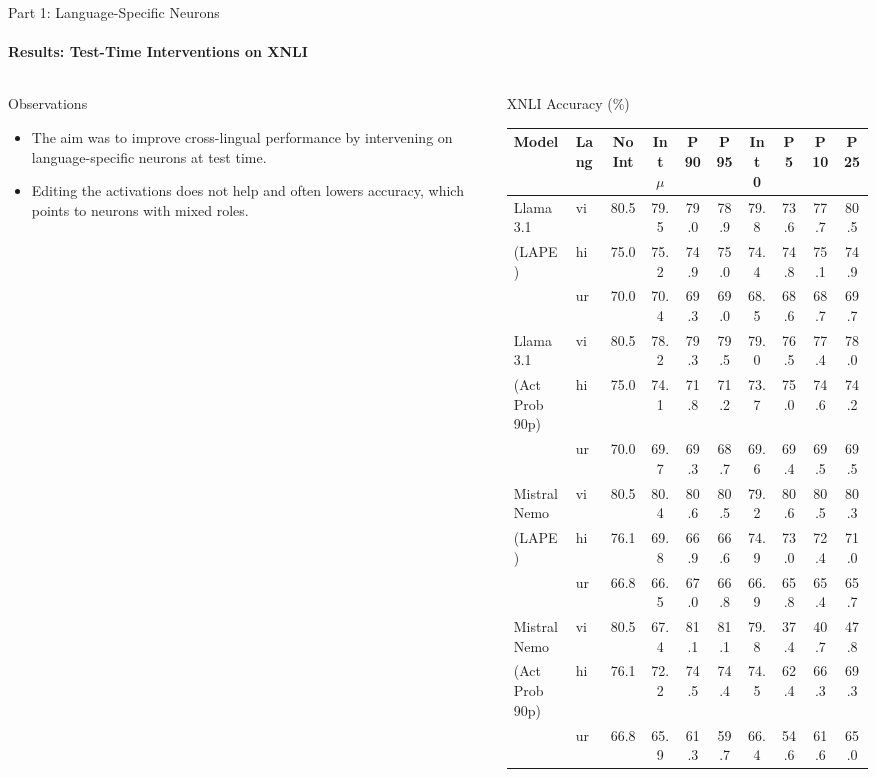 \documentclass[aspectratio=169]{beamer}
\begin{document}
	\begin{frame}{Part 1: Language-Specific Neurons}
		\framesubtitle{Results: Test-Time Interventions on XNLI}
		\begin{columns}
			\begin{column}{0.35\textwidth}
				\begin{block}{\scriptsize Observations}\scriptsize
					\begin{itemize}
						\item The aim was to improve cross-lingual performance by intervening on language-specific neurons at test time.
						\item Editing the activations does not help and often lowers accuracy, which points to neurons with mixed roles.
					\end{itemize}
				\end{block}
			\end{column}
			\begin{column}{0.55\textwidth}
				\begin{block}{\scriptsize XNLI Accuracy (\%)}\tiny
					\centering
					\setlength{\tabcolsep}{3pt}
					\begin{tabular}{l l c c c c c c c c}
						\toprule
						Model & Lang & No Int & Int $\mu$ & P90 & P95 & Int 0 & P5 & P10 & P25 \\
						\midrule
						Llama 3.1 & vi & 80.5 & 79.5 & 79.0 & 78.9 & 79.8 & 73.6 & 77.7 & 80.5 \\
						(LAPE) & hi & 75.0 & 75.2 & 74.9 & 75.0 & 74.4 & 74.8 & 75.1 & 74.9 \\
						& ur & 70.0 & 70.4 & 69.3 & 69.0 & 68.5 & 68.6 & 68.7 & 69.7 \\
						\midrule
						Llama 3.1 & vi & 80.5 & 78.2 & 79.3 & 79.5 & 79.0 & 76.5 & 77.4 & 78.0 \\
						(Act Prob 90p) & hi & 75.0 & 74.1 & 71.8 & 71.2 & 73.7 & 75.0 & 74.6 & 74.2 \\
						& ur & 70.0 & 69.7 & 69.3 & 68.7 & 69.6 & 69.4 & 69.5 & 69.5 \\
						\midrule
						Mistral Nemo & vi & 80.5 & 80.4 & 80.6 & 80.5 & 79.2 & 80.6 & 80.5 & 80.3 \\
						(LAPE) & hi & 76.1 & 69.8 & 66.9 & 66.6 & 74.9 & 73.0 & 72.4 & 71.0 \\
						& ur & 66.8 & 66.5 & 67.0 & 66.8 & 66.9 & 65.8 & 65.4 & 65.7 \\
						\midrule
						Mistral Nemo & vi & 80.5 & 67.4 & 81.1 & 81.1 & 79.8 & 37.4 & 40.7 & 47.8 \\
						(Act Prob 90p) & hi & 76.1 & 72.2 & 74.5 & 74.4 & 74.5 & 62.4 & 66.3 & 69.3 \\
						& ur & 66.8 & 65.9 & 61.3 & 59.7 & 66.4 & 54.6 & 61.6 & 65.0 \\
						\bottomrule
					\end{tabular}
				\end{block}
			\end{column}
		\end{columns}
	\end{frame}
	
\end{document}
